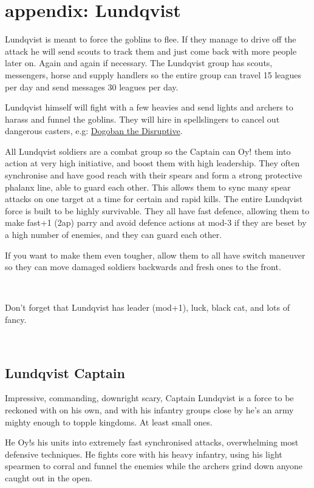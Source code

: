 \section*{appendix: Lundqvist}
\label{appendixlundqvist}

Lundqvist is meant to force the goblins to flee. If they manage to drive off the attack he will send scouts to track them and just come back with more people later on. Again and again if necessary. 
The Lundqvist group has scouts, messengers, horse and supply handlers so the entire group can travel 15 leagues per day and send messages 30 leagues per day.

Lundqvist himself will fight with a few heavies and send lights and archers to harass and funnel the goblins. They will hire in spellslingers to cancel out dangerous casters, e.g: \hyperref[dogobanthedisruptive]{Dogoban the Disruptive}.

All Lundqvist soldiers are a combat group so the Captain can Oy! them into action at very high initiative, and boost them with high leadership. They often synchronise and have good reach with their spears and form a strong protective phalanx line, able to guard each other. This allows them to sync many spear attacks on one target at a time for certain and rapid kills. 
The entire Lundqvist force is built to be highly survivable. They all have fast defence, allowing them to make fast+1 (2ap) parry and avoid defence actions at mod-3 if they are beset by a high number of enemies, and they can guard each other.

If you want to make them even tougher, allow them to all have switch maneuver so they can move damaged soldiers backwards and fresh ones to the front.

\

\noindent Don't forget that Lundqvist has leader (mod+1), luck, black cat, and lots of fancy.

\

\subsection*{Lundqvist Captain}

Impressive, commanding, downright scary, Captain Lundqvist is a force to be reckoned with on his own, and with his infantry groups close by he's an army mighty enough to topple kingdoms. At least small ones.

He Oy!s his units into extremely fast synchronised attacks, overwhelming most defensive techniques. He fights core with his heavy infantry, using his light spearmen to corral and funnel the enemies while the archers grind down anyone caught out in the open.

